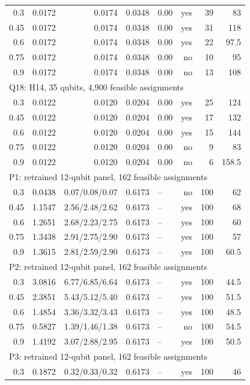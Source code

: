\begin{longtable}{rrrrlrrr}
0.3 & 0.0172 & 0.0174 & 0.0348 & 0.00 & yes & 39 & 83 \\
0.45 & 0.0172 & 0.0174 & 0.0348 & 0.00 & yes & 31 & 118 \\
0.6 & 0.0172 & 0.0174 & 0.0348 & 0.00 & yes & 22 & 97.5 \\
0.75 & 0.0172 & 0.0174 & 0.0348 & 0.00 & no & 10 & 95 \\
0.9 & 0.0172 & 0.0174 & 0.0348 & 0.00 & no & 13 & 108 \\
\multicolumn{8}{l}{Q18: H14, 35 qubits, 4,900 feasible assignments} \\
0.3 & 0.0122 & 0.0120 & 0.0204 & 0.00 & yes & 25 & 124 \\
0.45 & 0.0122 & 0.0120 & 0.0204 & 0.00 & yes & 17 & 132 \\
0.6 & 0.0122 & 0.0120 & 0.0204 & 0.00 & yes & 15 & 144 \\
0.75 & 0.0122 & 0.0120 & 0.0204 & 0.00 & no & 9 & 83 \\
0.9 & 0.0122 & 0.0120 & 0.0204 & 0.00 & no & 6 & 158.5 \\
\multicolumn{8}{l}{P1: retrained 12-qubit panel, 162 feasible assignments} \\
0.3 & 0.0438 & 0.07/0.08/0.07 & 0.6173 & -- & no & 100 & 62 \\
0.45 & 1.1547 & 2.56/2.48/2.62 & 0.6173 & -- & yes & 100 & 68 \\
0.6 & 1.2651 & 2.68/2.23/2.75 & 0.6173 & -- & yes & 100 & 60 \\
0.75 & 1.3438 & 2.91/2.75/2.90 & 0.6173 & -- & yes & 100 & 57 \\
0.9 & 1.3615 & 2.81/2.59/2.90 & 0.6173 & -- & yes & 100 & 60.5 \\
\multicolumn{8}{l}{P2: retrained 12-qubit panel, 162 feasible assignments} \\
0.3 & 3.0816 & 6.77/6.85/6.64 & 0.6173 & -- & yes & 100 & 44.5 \\
0.45 & 2.3851 & 5.43/5.12/5.40 & 0.6173 & -- & yes & 100 & 51.5 \\
0.6 & 1.4854 & 3.36/3.32/3.43 & 0.6173 & -- & yes & 100 & 48.5 \\
0.75 & 0.5827 & 1.39/1.46/1.38 & 0.6173 & -- & no & 100 & 54.5 \\
0.9 & 1.4192 & 3.07/2.88/2.95 & 0.6173 & -- & yes & 100 & 50.5 \\
\multicolumn{8}{l}{P3: retrained 12-qubit panel, 162 feasible assignments} \\
0.3 & 0.1872 & 0.32/0.33/0.32 & 0.6173 & -- & yes & 100 & 46 \\

\end{longtable}
